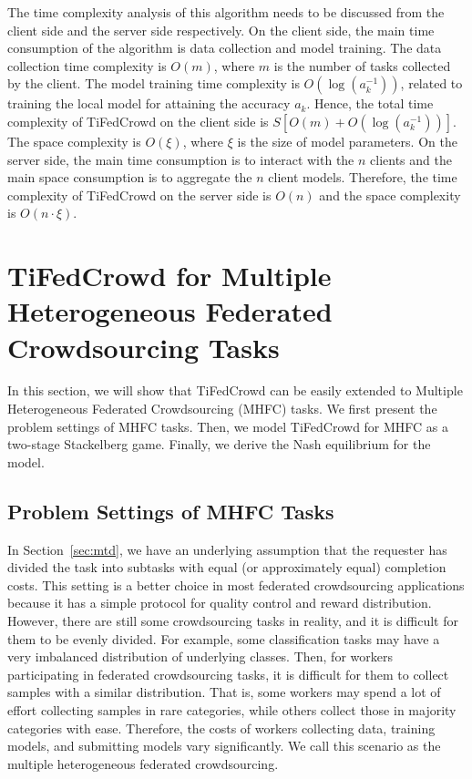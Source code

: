\documentclass[final,1p,times]{elsarticle}
\begin{document}
The time complexity analysis of this algorithm needs to be discussed from the client side and the server side respectively. On the client side, the main time consumption of the algorithm is data collection and model training. The data collection time complexity is $O(m)$, where $m$ is the number of tasks collected by the client. The model training time complexity is $O(\log(a_k^{-1}))$, related to training the local model for attaining the accuracy $a_k$. Hence, the total time complexity of TiFedCrowd on the client side is $S[O(m)+O(\log(a_k^{-1}))]$. The space complexity is $O(\xi)$, where $\xi$ is the size of model parameters. On the server side, the main time consumption is to interact with the $n$ clients and the main space consumption is to aggregate the $n$ client models. Therefore, the time complexity of TiFedCrowd on the server side is $O(n)$ and the space complexity is $O(n\cdot\xi)$.

\section{TiFedCrowd for Multiple Heterogeneous Federated Crowdsourcing Tasks} \label{tmh}
In this section, we will show that TiFedCrowd can be easily extended to Multiple Heterogeneous Federated Crowdsourcing (MHFC) tasks. We first present the problem settings of MHFC tasks. Then, we model TiFedCrowd for MHFC as a two-stage Stackelberg game. Finally, we derive the Nash equilibrium for the model.

\subsection{Problem Settings of MHFC Tasks}
In Section~\ref{sec:mtd}, we have an underlying assumption that the requester has divided the task into subtasks with equal (or approximately equal) completion costs. This setting is a better choice in most federated crowdsourcing applications because it has a simple protocol for quality control and reward distribution. However, there are still some crowdsourcing tasks in reality, and it is difficult for them to be evenly divided. For example, some classification tasks may have a very imbalanced distribution of underlying classes. Then, for workers participating in federated crowdsourcing tasks, it is difficult for them to collect samples with a similar distribution. That is, some workers may spend a lot of effort collecting samples in rare categories, while others collect those in majority categories with ease. Therefore, the costs of workers collecting data, training models, and submitting models vary significantly. We call this scenario as the multiple heterogeneous federated crowdsourcing.
\end{document}
